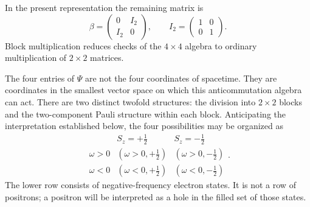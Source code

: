 \begin{classroomqa}
\end{classroomqa}

In the present representation the remaining matrix is
\begin{equation}
\beta=
\begin{pmatrix}
0&I_2\\
I_2&0
\end{pmatrix},
\qquad
I_2=
\begin{pmatrix}
1&0\\
0&1
\end{pmatrix}.
\end{equation}
Block multiplication reduces checks of the \(4\times4\) algebra to ordinary multiplication of \(2\times2\) matrices.

\begin{classroomqa}
\end{classroomqa}

The four entries of \(\Psi\) are not the four coordinates of spacetime. They are coordinates in the smallest vector space on which this anticommutation algebra can act. There are two distinct twofold structures: the division into \(2\times2\) blocks and the two-component Pauli structure within each block. Anticipating the interpretation established below, the four possibilities may be organized as
\begin{equation}
\begin{array}{c|cc}
& S_z=+\tfrac12 & S_z=-\tfrac12\\ \hline
\omega>0 & (\omega>0,+\tfrac12) & (\omega>0,-\tfrac12)\\
\omega<0 & (\omega<0,+\tfrac12) & (\omega<0,-\tfrac12)
\end{array}.
\end{equation}
The lower row consists of negative-frequency electron states. It is not a row of positrons; a positron will be interpreted as a hole in the filled set of those states.


